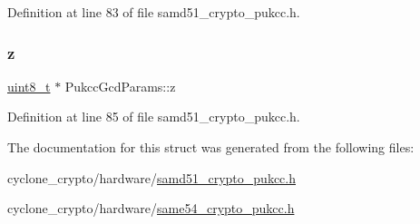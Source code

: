 Definition at line 83 of file samd51\+\_\+crypto\+\_\+pukcc.\+h.

\mbox{\label{structPukccGcdParams_aaf07c87d429ef806d1b8441850ccbdf7}} 
\subsubsection{\texorpdfstring{z}{z}}
{\footnotesize\ttfamily \hyperlink{stdint_8h_aba7bc1797add20fe3efdf37ced1182c5}{uint8\+\_\+t} $\ast$ Pukcc\+Gcd\+Params\+::z}



Definition at line 85 of file samd51\+\_\+crypto\+\_\+pukcc.\+h.



The documentation for this struct was generated from the following files\+:\begin{DoxyCompactItemize}
\item 
cyclone\+\_\+crypto/hardware/\hyperlink{samd51__crypto__pukcc_8h}{samd51\+\_\+crypto\+\_\+pukcc.\+h}\item 
cyclone\+\_\+crypto/hardware/\hyperlink{same54__crypto__pukcc_8h}{same54\+\_\+crypto\+\_\+pukcc.\+h}\end{DoxyCompactItemize}
